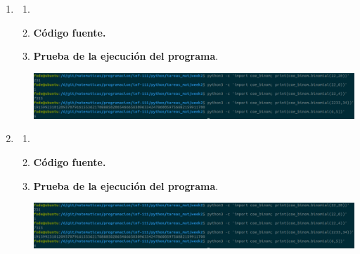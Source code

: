\begin{enumerate}
\begin{enumerate}[\bfseries a)]
    \end{enumerate}

\newpage


\item

    \begin{enumerate}[\bfseries a)]

	\item

	\item \textbf{Código fuente.}\\ 
	    
	    
	    \vspace{3cm}
	
	\item \textbf{Prueba de la ejecución del programa}.\\
	    \begin{center}
		\includegraphics[scale=.35]{imagenes/tareas_mat/week2/coe_binom.png}
	    \end{center}

    \end{enumerate}

\newpage

\item

    \begin{enumerate}[\bfseries a)]

	\item

	\item \textbf{Código fuente.}\\ 
	    
	    
	    \vspace{3cm}
	
	\item \textbf{Prueba de la ejecución del programa}.\\
	    \begin{center}
		\includegraphics[scale=.35]{imagenes/tareas_mat/week2/coe_binom.png}
	    \end{center}


\end{enumerate}
\end{enumerate}
